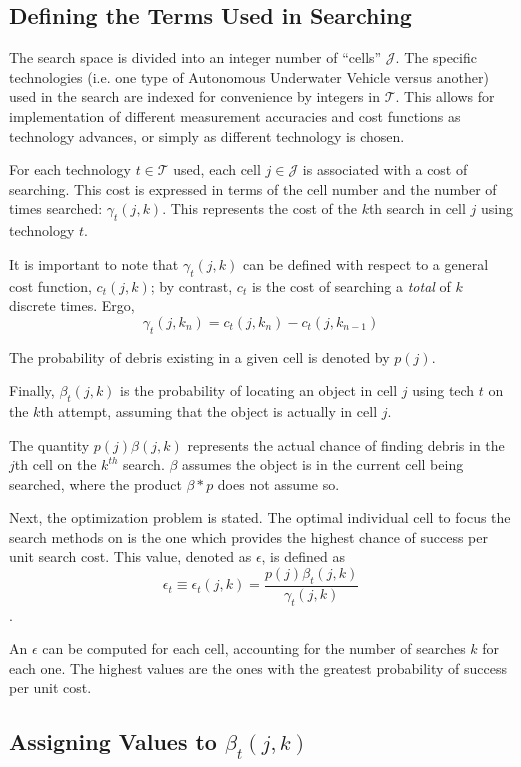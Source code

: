 \documentclass[a4paper]{article}
\begin{document}
\subsection{Defining the Terms Used in Searching}

The search space is divided into an integer number of ``cells'' $\mathcal{J}$. The specific technologies (i.e. one type of Autonomous Underwater Vehicle versus another) used in the search are indexed for convenience by integers in $\mathcal{T}$. This allows for implementation of different measurement accuracies and cost functions as technology advances, or simply as different technology is chosen. 

For each technology $t\in\mathcal{T}$ used, each cell $j\in\mathcal{J}$ is associated with a cost of searching. This cost is expressed in terms of the cell number and the number of times searched: $\gamma_t(j,k)$. This represents the cost of the $k$th search in cell $j$ using technology $t$.

It is important to note that $\gamma_t(j,k)$ can be defined with respect to a general cost function, $c_t(j,k)$; by contrast, $c_t$ is the cost of searching  a \textit{total} of $k$ discrete times. Ergo, $$\gamma_t(j,k_n)=c_t(j,k_n)-c_t(j,k_{n-1})$$

The probability of debris existing in a given cell is denoted by $p(j)$.

Finally, $\beta_t(j,k)$ is the probability of locating an object in cell $j$ using tech $t$ on the $k$th attempt, assuming that the object is actually in cell $j$.

The quantity $p(j)\beta(j,k)$ represents the actual chance of finding debris in the $j$th cell on the $k^{th}$ search. $\beta$ assumes the object is in the current cell being searched, where the product $\beta * p$ does not assume so.

Next, the optimization problem is stated. The optimal individual cell to focus the search methods on is the one which provides the highest chance of success per unit search cost. This value, denoted as $\epsilon$, is defined as $$\epsilon_t\equiv\epsilon_t(j,k)=\frac{p(j)\beta_t(j,k)}{\gamma_t(j,k)}$$. 

An $\epsilon$ can be computed for each cell, accounting for the number of searches $k$ for each one. The highest values are the ones with the greatest probability of success per unit cost. 

\subsection{Assigning Values to $\beta_t(j,k)$}
\end{document}
